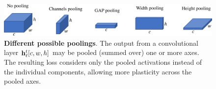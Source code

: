 \begin{figure}[tb]
    \begin{center}
        \includegraphics[width=0.90\linewidth]{images/podnet/pooling}
    \end{center}
    \caption{\textbf{Different possible poolings}. The output from a convolutional layer
        $\mathbf{h}^{t}_\ell[c,w,h]$ may be pooled (summed over) one or more axes. The resulting loss
        considers only the pooled activations instead of the individual components, allowing more
        plasticity across the pooled axes.}
    \label{fig:podnet_pooling}
\end{figure}

